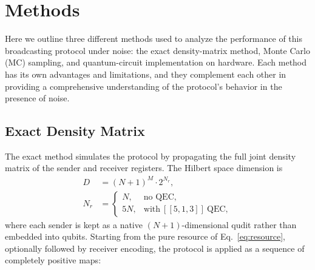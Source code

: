 \documentclass[aps,physrev,10pt,twocolumn,superscriptaddress,floatfix]{revtex4-2}
\begin{document}
\section{Methods}
Here we outline three different methods used to analyze the performance of this broadcasting protocol under noise: the exact density-matrix method, Monte Carlo (MC) sampling, and quantum-circuit implementation on hardware. Each method has its own advantages and limitations, and they complement each other in providing a comprehensive understanding of the protocol's behavior in the presence of noise.
\subsection{Exact Density Matrix}
The exact method simulates the protocol by propagating the full joint density matrix of the sender and receiver registers. The Hilbert space dimension is
\begin{align}
    D &= (N+1)^M \cdot 2^{N_r}, \\
    N_r &= \begin{cases} N, & \text{no QEC}, \\ 5N, & \text{with}~[[5,1,3]]~\text{QEC}, \end{cases}
\end{align}
where each sender is kept as a native $(N{+}1)$-dimensional qudit rather than embedded into qubits. Starting from the pure resource of Eq.~\eqref{eq:resource}, optionally followed by receiver encoding, the protocol is applied as a sequence of completely positive maps:
\end{document}
